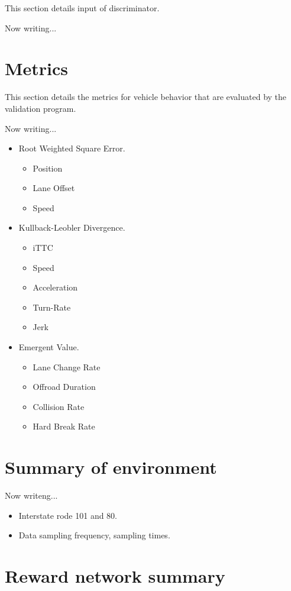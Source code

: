 This section details input of discriminator.

Now writing...

\section{Metrics}


This section details the metrics for vehicle behavior that are evaluated by the validation program.

Now writing...

\begin{itemize}
\item Root Weighted Square Error.
\begin{itemize}
\item Position
\item Lane Offset
\item Speed
\end{itemize}
\item Kullback-Leobler Divergence.
\begin{itemize}
\item iTTC
\item Speed
\item Acceleration
\item Turn-Rate
\item Jerk
\end{itemize}
\item Emergent Value.
\begin{itemize}
\item Lane Change Rate
\item Offroad Duration
\item Collision Rate
\item Hard Break Rate
\end{itemize}
\end{itemize}

\section{Summary of environment}

Now writeng...

\begin{itemize}
\item Interstate rode 101 and 80.
\item Data sampling frequency, sampling times.
\end{itemize}


\section{Reward network summary}

